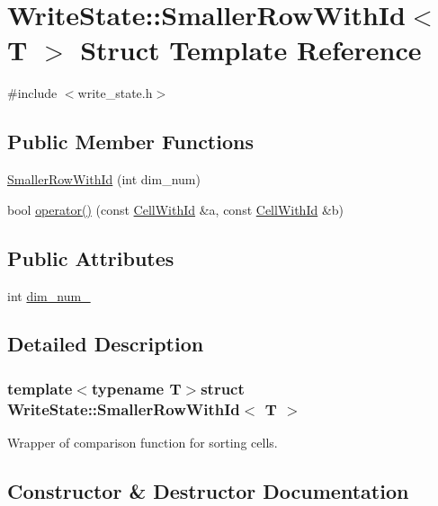 \hypertarget{structWriteState_1_1SmallerRowWithId}{}\section{Write\+State\+:\+:Smaller\+Row\+With\+Id$<$ T $>$ Struct Template Reference}
\label{structWriteState_1_1SmallerRowWithId}


{\ttfamily \#include $<$write\+\_\+state.\+h$>$}

\subsection*{Public Member Functions}
\begin{DoxyCompactItemize}
\item 
\hyperlink{structWriteState_1_1SmallerRowWithId_acd6da465c40b14c302c0a42cc768b130}{Smaller\+Row\+With\+Id} (int dim\+\_\+num)
\item 
bool \hyperlink{structWriteState_1_1SmallerRowWithId_a43254de6a3d0adb36e57db2fad085445}{operator()} (const \hyperlink{structWriteState_1_1CellWithId}{Cell\+With\+Id} \&a, const \hyperlink{structWriteState_1_1CellWithId}{Cell\+With\+Id} \&b)
\end{DoxyCompactItemize}
\subsection*{Public Attributes}
\begin{DoxyCompactItemize}
\item 
int \hyperlink{structWriteState_1_1SmallerRowWithId_a9e9a8cf8799ae4272c3d9c699ac9a10d}{dim\+\_\+num\+\_\+}
\end{DoxyCompactItemize}


\subsection{Detailed Description}
\subsubsection*{template$<$typename T$>$struct Write\+State\+::\+Smaller\+Row\+With\+Id$<$ T $>$}

Wrapper of comparison function for sorting cells. 

\subsection{Constructor \& Destructor Documentation}
\hypertarget{structWriteState_1_1SmallerRowWithId_acd6da465c40b14c302c0a42cc768b130}{}
